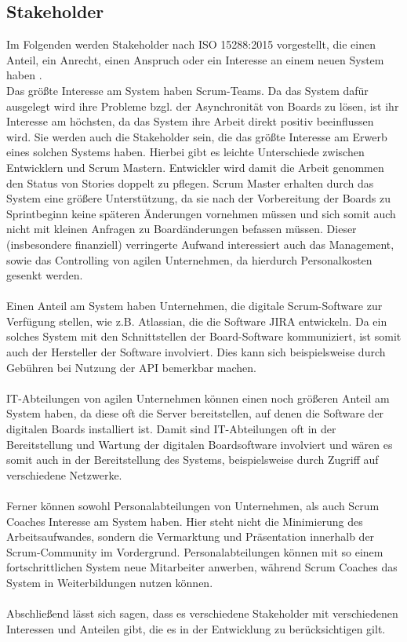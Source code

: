 \documentclass[12pt,titlepage]{scrartcl}
\begin{document}
		\subsection{Stakeholder}
		Im Folgenden werden Stakeholder nach ISO 15288:2015 vorgestellt, die einen Anteil, ein Anrecht, einen Anspruch oder ein Interesse an einem neuen System haben \cite{ISO15288}.  \\
		Das größte Interesse am System haben Scrum-Teams. Da das System dafür ausgelegt wird ihre Probleme bzgl. der Asynchronität von Boards zu lösen, ist ihr Interesse am höchsten, da das System ihre Arbeit direkt positiv beeinflussen wird. Sie werden auch die Stakeholder sein, die das größte Interesse am Erwerb eines solchen Systems haben. Hierbei gibt es leichte Unterschiede zwischen Entwicklern und Scrum Mastern. Entwickler wird damit die Arbeit genommen den Status von Stories doppelt zu pflegen. Scrum Master erhalten durch das System eine größere Unterstützung, da sie nach der Vorbereitung der Boards zu Sprintbeginn keine späteren Änderungen vornehmen müssen und sich somit auch nicht mit kleinen Anfragen zu Boardänderungen befassen müssen. Dieser (insbesondere finanziell) verringerte Aufwand interessiert auch das Management, sowie das Controlling von agilen Unternehmen, da hierdurch Personalkosten gesenkt werden. \\ \\
		Einen Anteil am System haben Unternehmen, die digitale Scrum-Software zur Verfügung stellen, wie z.B. Atlassian, die die Software JIRA entwickeln. Da ein solches System mit den Schnittstellen der Board-Software kommuniziert, ist somit auch der Hersteller der Software involviert. Dies kann sich beispielsweise durch Gebühren bei Nutzung der API bemerkbar machen. \\ \\
		IT-Abteilungen von agilen Unternehmen können einen noch größeren Anteil am System haben, da diese oft die Server bereitstellen, auf denen die Software der digitalen Boards installiert ist. Damit sind IT-Abteilungen oft in der Bereitstellung und Wartung der digitalen Boardsoftware involviert und wären es somit auch in der Bereitstellung des Systems, beispielsweise durch Zugriff auf verschiedene Netzwerke. \\ \\
		Ferner können sowohl Personalabteilungen von Unternehmen, als auch Scrum Coaches Interesse am System haben. Hier steht nicht die Minimierung des Arbeitsaufwandes, sondern die Vermarktung und Präsentation innerhalb der Scrum-Community im Vordergrund. Personalabteilungen können mit so einem fortschrittlichen System neue Mitarbeiter anwerben, während Scrum Coaches das System in Weiterbildungen nutzen können. \\ \\
		Abschließend lässt sich sagen, dass es verschiedene Stakeholder mit verschiedenen Interessen und Anteilen gibt, die es in der Entwicklung zu berücksichtigen gilt.
\end{document}

